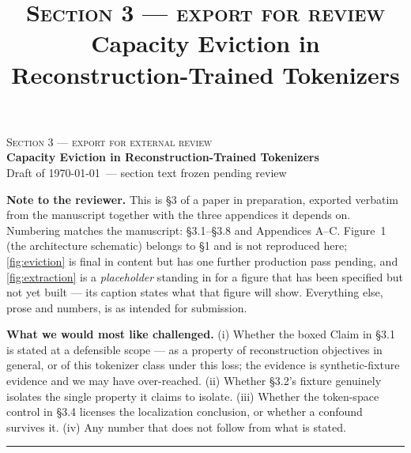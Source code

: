 \documentclass[10pt]{article}
\title{\normalsize\textsc{Section 3 --- export for review}\\[0.6em]
       \Large Capacity Eviction in Reconstruction-Trained Tokenizers}
\author{}
\date{}
\begin{document}
\makeatletter
{}
\makeatother

\setcounter{section}{2}   %
\setcounter{figure}{1}    %
\setcounter{table}{0}

{\centering
{\normalsize\textsc{Section 3 --- export for external review}}\\[0.5em]
{\Large\bfseries Capacity Eviction in Reconstruction-Trained Tokenizers}\\[0.4em]
{\small\color{tolgrey} Draft of \today\ --- section text frozen pending review}\\[1.6em]
}

\noindent\textbf{Note to the reviewer.} This is \S3 of a paper in preparation, exported verbatim
from the manuscript together with the three appendices it depends on. Numbering matches the
manuscript: \S3.1--\S3.8 and Appendices A--C. Figure~1 (the architecture schematic) belongs to \S1
and is not reproduced here; \cref{fig:eviction} is final in content but has one further production
pass pending, and \cref{fig:extraction} is a \emph{placeholder} standing in for a figure that has
been specified but not yet built --- its caption states what that figure will show. Everything
else, prose and numbers, is as intended for submission.

\medskip
\noindent\textbf{What we would most like challenged.} (i) Whether the boxed Claim in \S3.1 is
stated at a defensible scope --- as a property of reconstruction objectives in general, or of this
tokenizer class under this loss; the evidence is synthetic-fixture evidence and we may have
over-reached. (ii) Whether \S3.2's fixture genuinely isolates the single property it claims to
isolate. (iii) Whether the token-space control in \S3.4 licenses the localization conclusion, or
whether a confound survives it. (iv) Any number that does not follow from what is stated.

\bigskip
\hrule
\bigskip



\clearpage
\appendix


\clearpage


\end{document}
